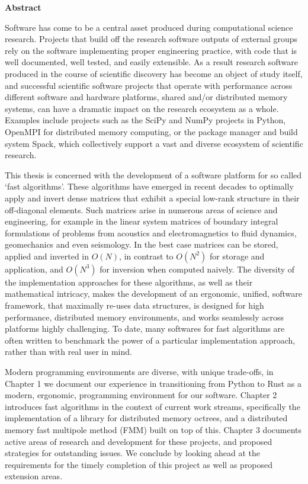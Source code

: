 \thispagestyle{plain}

\begin{center}
    \textbf{Abstract}
\end{center}

Software has come to be a central asset produced during
computational science research. Projects that build off the research software outputs of external
groups rely on the software implementing proper engineering practice,
with code that is well documented, well tested, and easily extensible. As a
result research software produced in the course of scientific discovery has
become an object of study itself, and successful scientific software projects
that operate with performance across different software and hardware platforms,
shared and/or distributed memory systems, can have a dramatic impact on the
research ecosystem as a whole. Examples include projects such as the SciPy and
NumPy projects in Python, OpenMPI for distributed memory computing, or the package
manager and build system Spack, which collectively support a vast and diverse ecosystem of scientific
research.

This thesis is concerned with the development of a software platform
for so called `fast algorithms'. These algorithms have emerged in recent decades to
optimally apply and invert dense matrices that exhibit
a special low-rank structure in their off-diagonal elements. Such matrices arise
in numerous areas of science and engineering, for example in the linear system
matrices of boundary integral formulations of problems from acoustics and
electromagnetics to fluid dynamics, geomechanics and even seismology. In the
best case matrices can be stored, applied and inverted in $O(N)$, in contrast
to $O(N^2)$ for storage and application, and $O(N^3)$ for inversion when computed
naively. The diversity of the implementation approaches for these algorithms, as
well as their mathematical intricacy, makes the development of an ergonomic,
unified, software framework, that maximally re-uses data structures, is designed
for high performance, distributed memory environments, and works seamlessly
across platforms highly challenging. To date, many softwares for fast algorithms
are often written to benchmark the power of a particular implementation approach,
rather than with real user in mind.

 Modern programming environments are diverse, with unique trade-offs, in Chapter 1 we document our experience in transitioning from Python to Rust as a
modern, ergonomic, programming environment for our software. Chapter 2 introduces
fast algorithms in the context of current work streams, specifically the
implementation of a library for distributed memory octrees, and a distributed memory fast
multipole method (FMM) built on top of this. Chapter 3 documents active areas
of research and development for these projects, and proposed strategies for
outstanding issues. We conclude by looking ahead at the requirements for the
timely completion of this project as well as proposed extension areas.
